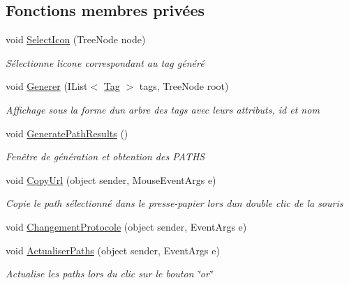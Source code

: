 \subsection*{Fonctions membres privées}
\begin{DoxyCompactItemize}
\item 
void \mbox{\hyperlink{class_m_t_connect_agent_1_1_user_control_display_tab_aea40e1e7daf5f6821fc4b6c7dc717563}{Select\+Icon}} (Tree\+Node node)
\begin{DoxyCompactList}\small\item\em Sélectionne l\textquotesingle{}icone correspondant au tag généré \end{DoxyCompactList}\item 
void \mbox{\hyperlink{class_m_t_connect_agent_1_1_user_control_display_tab_a936a17ca9a88c0cbab0e70894567cdad}{Generer}} (I\+List$<$ \mbox{\hyperlink{class_m_t_connect_agent_1_1_model_1_1_tag}{Tag}} $>$ tags, Tree\+Node root)
\begin{DoxyCompactList}\small\item\em Affichage sous la forme d\textquotesingle{}un arbre des tags avec leurs attributs, id et nom \end{DoxyCompactList}\item 
void \mbox{\hyperlink{class_m_t_connect_agent_1_1_user_control_display_tab_a8007de48e5b3c138c3260fa361f744c0}{Generate\+Path\+Results}} ()
\begin{DoxyCompactList}\small\item\em Fenêtre de génération et obtention des P\+A\+T\+HS \end{DoxyCompactList}\item 
void \mbox{\hyperlink{class_m_t_connect_agent_1_1_user_control_display_tab_ac246a46fbe6cab71326ea2a6e6ade5cd}{Copy\+Url}} (object sender, Mouse\+Event\+Args e)
\begin{DoxyCompactList}\small\item\em Copie le path sélectionné dans le presse-\/papier lors d\textquotesingle{}un double clic de la souris \end{DoxyCompactList}\item 
void \mbox{\hyperlink{class_m_t_connect_agent_1_1_user_control_display_tab_ae279107d6601b7bc7b28a44dcbc68e5e}{Changement\+Protocole}} (object sender, Event\+Args e)
\item 
void \mbox{\hyperlink{class_m_t_connect_agent_1_1_user_control_display_tab_a2f29e407545f62944defd9533dc895e0}{Actualiser\+Paths}} (object sender, Event\+Args e)
\begin{DoxyCompactList}\small\item\em Actualise les paths lors du clic sur le bouton \char`\"{}or\char`\"{} \end{DoxyCompactList}\item 

\end{DoxyCompactItemize}
